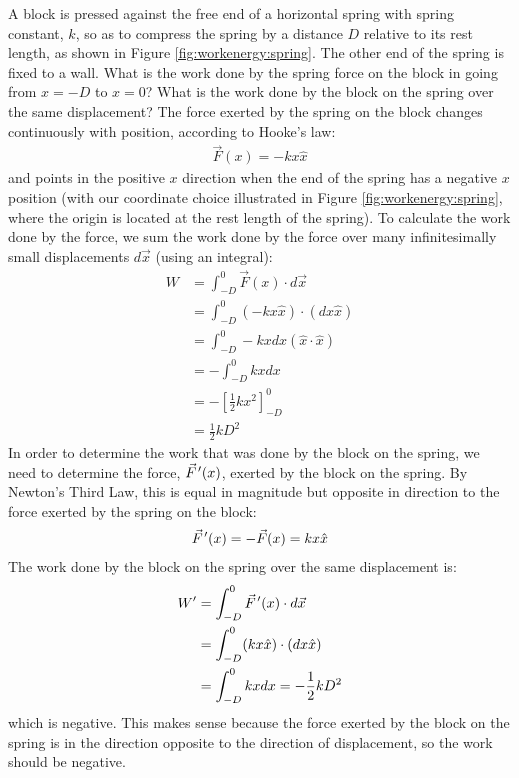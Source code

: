 \begin{example}{\label{ex:workenergy:spring} A block is pressed against the free end of a horizontal spring with spring constant, $k$, so as to compress the spring by a distance $D$ relative to its rest length, as shown in Figure \ref{fig:workenergy:spring}. The other end of the spring is fixed to a wall. What is the work done by the spring force on the block in going from $x=-D$ to $x=0$? What is the work done by the block on the spring over the same displacement?
}
The force exerted by the spring on the block changes continuously with position, according to Hooke's law:
\begin{align*}
\vec F(x) = -kx \hat x
\end{align*}
and points in the positive $x$ direction when the end of the spring has a negative $x$ position (with our coordinate choice illustrated in Figure \ref{fig:workenergy:spring}, where the origin is located at the rest length of the spring). To calculate the work done by the force, we sum the work done by the force over many infinitesimally small displacements $d\vec x$ (using an integral):
\begin{align*}
W &= \int_{-D}^0 \vec F(x) \cdot d\vec x\\
&=\int_{-D}^0 (-kx \hat x) \cdot (dx \hat x)\\
&=\int_{-D}^0 -kxdx (\hat x \cdot \hat x)\\
&=-\int_{-D}^0 kx dx\\
&=-\left[\frac{1}{2}kx^2  \right]_{-D}^0\\
&=\frac{1}{2}kD^2
\end{align*}
In order to determine the work that was done by the block on the spring, we need to determine the force, $\pvec F'(x)$, exerted by the block on the spring. By Newton's Third Law, this is equal in magnitude but opposite in direction to the force exerted by the spring on the block:
\begin{align*}
\pvec F'(x) = -\vec F(x) = kx \hat x
\end{align*}
The work done by the block on the spring over the same displacement is:
\begin{align*}
W' &= \int_{-D}^0 \pvec F'(x) \cdot d\vec x\\
&=\int_{-D}^0 (kx \hat x) \cdot (dx \hat x)\\
&=\int_{-D}^0 kx dx=-\frac{1}{2}kD^2\\
\end{align*}
which is negative. This makes sense because the force exerted by the block on the spring is in the direction opposite to the direction of displacement, so the work should be negative. 
\end{example}


